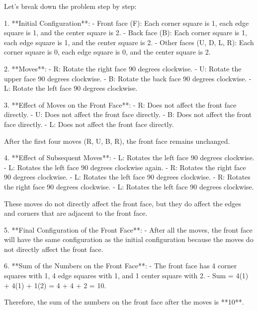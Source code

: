 Let's break down the problem step by step:

1. **Initial Configuration**:
   - Front face (F): Each corner square is 1, each edge square is 1, and the center square is 2.
   - Back face (B): Each corner square is 1, each edge square is 1, and the center square is 2.
   - Other faces (U, D, L, R): Each corner square is 0, each edge square is 0, and the center square is 2.

2. **Moves**:
   - R: Rotate the right face 90 degrees clockwise.
   - U: Rotate the upper face 90 degrees clockwise.
   - B: Rotate the back face 90 degrees clockwise.
   - L: Rotate the left face 90 degrees clockwise.

3. **Effect of Moves on the Front Face**:
   - R: Does not affect the front face directly.
   - U: Does not affect the front face directly.
   - B: Does not affect the front face directly.
   - L: Does not affect the front face directly.

   After the first four moves (R, U, B, R), the front face remains unchanged.

4. **Effect of Subsequent Moves**:
   - L: Rotates the left face 90 degrees clockwise.
   - L: Rotates the left face 90 degrees clockwise again.
   - R: Rotates the right face 90 degrees clockwise.
   - L: Rotates the left face 90 degrees clockwise.
   - R: Rotates the right face 90 degrees clockwise.
   - L: Rotates the left face 90 degrees clockwise.

   These moves do not directly affect the front face, but they do affect the edges and corners that are adjacent to the front face.

5. **Final Configuration of the Front Face**:
   - After all the moves, the front face will have the same configuration as the initial configuration because the moves do not directly affect the front face.

6. **Sum of the Numbers on the Front Face**:
   - The front face has 4 corner squares with 1, 4 edge squares with 1, and 1 center square with 2.
   - Sum = 4(1) + 4(1) + 1(2) = 4 + 4 + 2 = 10.

Therefore, the sum of the numbers on the front face after the moves is **10**.
